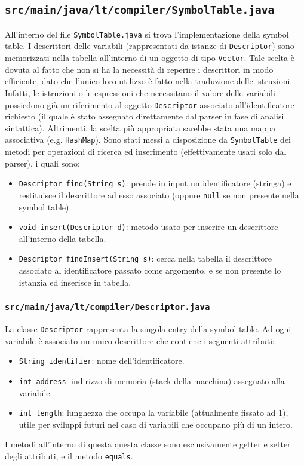 \documentclass[10pt,a4paper]{article}
\begin{document}
\subsection{\texttt{src/main/java/lt/compiler/SymbolTable.java}}
All'interno del file \texttt{SymbolTable.java} si trova l'implementazione della symbol table.
I descrittori delle variabili (rappresentati da istanze di \texttt{Descriptor}) sono memorizzati nella tabella all'interno di un oggetto di tipo \texttt{Vector}.
Tale scelta è dovuta al fatto che non si ha la necessità di reperire i descrittori in modo efficiente, dato che l'unico loro utilizzo è fatto nella traduzione delle istruzioni.
Infatti, le istruzioni o le espressioni che necessitano il valore delle variabili possiedono già un riferimento al oggetto \texttt{Descriptor} associato all'identificatore richiesto (il quale è stato assegnato direttamente dal parser in fase di analisi sintattica).
Altrimenti, la scelta più appropriata sarebbe stata una mappa associativa (e.g. \texttt{HashMap}).
Sono stati messi a disposizione da \texttt{SymbolTable} dei metodi per operazioni di ricerca ed inserimento (effettivamente usati solo dal parser), i quali sono:
\begin{itemize}
    \item \texttt{Descriptor find(String s)}: prende in input un identificatore (stringa) e restituisce il descrittore ad esso associato (oppure \texttt{null} se non presente nella symbol table).
    \item \texttt{void insert(Descriptor d)}: metodo usato per inserire un descrittore all'interno della tabella.
    \item \texttt{Descriptor findInsert(String s)}: cerca nella tabella il descrittore associato al identificatore passato come argomento, e se non presente lo istanzia ed inserisce in tabella.
\end{itemize}

\subsubsection{\texttt{src/main/java/lt/compiler/Descriptor.java}}
La classe \texttt{Descriptor} rappresenta la singola entry della symbol table.
Ad ogni variabile è associato un unico descrittore che contiene i seguenti attributi:
\begin{itemize}
    \item \texttt{String identifier}: nome dell'identificatore.
    \item \texttt{int address}: indirizzo di memoria (stack della macchina) assegnato alla variabile.
    \item \texttt{int length}: lunghezza che occupa la variabile (attualmente fissato ad 1), utile per sviluppi futuri nel caso di variabili che occupano più di un intero.
\end{itemize}
I metodi all'interno di questa questa classe sono esclusivamente getter e setter degli attributi, e il metodo \texttt{equals}.
\end{document}
